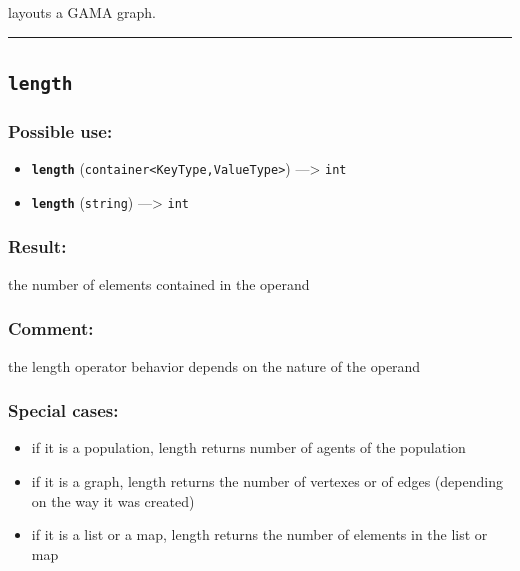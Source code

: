 \documentclass[]{book}
\providecommand{\tightlist}{%
  \setlength{\itemsep}{0pt}\setlength{\parskip}{0pt}}
\theoremstyle{definition}
\theoremstyle{definition}
\theoremstyle{definition}
\theoremstyle{remark}
\begin{document}
layouts a GAMA graph.

\begin{center}\rule{0.5\linewidth}{\linethickness}\end{center}

\subsection{\texorpdfstring{\texttt{length}}{length}}\label{length}

\subsubsection{Possible use:}\label{possible-use-320}

\begin{itemize}
\tightlist
\item
  \textbf{\texttt{length}}
  (\texttt{container\textless{}KeyType,ValueType\textgreater{}})
  ---\textgreater{} \texttt{int}
\item
  \textbf{\texttt{length}} (\texttt{string}) ---\textgreater{}
  \texttt{int}
\end{itemize}

\subsubsection{Result:}\label{result-310}

the number of elements contained in the operand

\subsubsection{Comment:}\label{comment-59}

the length operator behavior depends on the nature of the operand

\subsubsection{Special cases:}\label{special-cases-87}

\begin{itemize}
\tightlist
\item
  if it is a population, length returns number of agents of the
  population\\
\item
  if it is a graph, length returns the number of vertexes or of edges
  (depending on the way it was created)\\
\item
  if it is a list or a map, length returns the number of elements in the
  list or map
\end{itemize}
\end{document}
